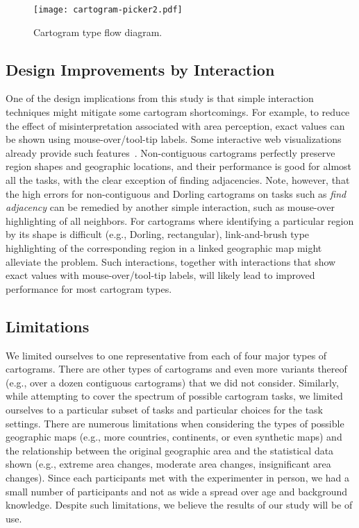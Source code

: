 \documentclass[10pt,journal,compsoc]{IEEEtran}
\begin{document}
\begin{figure}[h]
\centering
\texttt{[image: cartogram-picker2.pdf]}
\caption{Cartogram type flow diagram.}
\label{fig:picker}
\end{figure}



\subsection{Design Improvements by Interaction}
One of the design implications from this study is that simple interaction techniques might mitigate some cartogram shortcomings. 
For example, to reduce the effect of misinterpretation associated with area perception, exact values can be shown using mouse-over/tool-tip labels. Some interactive web visualizations already provide such features~\cite{NYT_O}. 
Non-contiguous cartograms  perfectly preserve region shapes and geographic locations,
 and their performance is good for almost all the tasks, with the clear exception of
 finding adjacencies. 
 Note, however, that the high errors for non-contiguous and Dorling cartograms on tasks such as  \textit{find adjacency} can be remedied by another simple interaction, such as mouse-over highlighting of all neighbors.
For cartograms where identifying a particular region by its shape is difficult (e.g., Dorling, rectangular), link-and-brush type highlighting of the corresponding region in a linked geographic map might alleviate the problem.  Such interactions, together with interactions that show exact values with mouse-over/tool-tip labels, will likely lead to improved performance for most cartogram types. 


\subsection{Limitations}
We limited ourselves to one representative from each of four major types of cartograms. There are other types of cartograms and even more variants thereof (e.g., over a dozen contiguous cartograms) that we did not consider. Similarly, while attempting to cover the spectrum of possible cartogram tasks, we limited ourselves to a particular subset of tasks and particular choices for the task settings. There are numerous limitations when considering the types of possible geographic maps (e.g., more countries, continents, or even synthetic maps) and the relationship between the original geographic area and the statistical data shown (e.g., extreme area changes, moderate area changes, insignificant area changes).
Since each participants met with the experimenter in person, we had a small number of participants and not as wide a spread over age and background knowledge. Despite such limitations, we believe the results of our study will be of use. 
\end{document}
